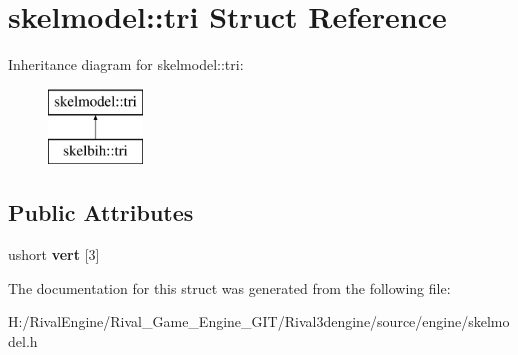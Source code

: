 \hypertarget{structskelmodel_1_1tri}{}\section{skelmodel\+:\+:tri Struct Reference}
\label{structskelmodel_1_1tri}
Inheritance diagram for skelmodel\+:\+:tri\+:\begin{figure}[H]
\begin{center}
\leavevmode
\includegraphics[height=2.000000cm]{structskelmodel_1_1tri}
\end{center}
\end{figure}
\subsection*{Public Attributes}
\begin{DoxyCompactItemize}
\item 
\mbox{\label{structskelmodel_1_1tri_a99b664da22e8a1d6eaefae6941d7a533}} 
ushort {\bfseries vert} \mbox{[}3\mbox{]}
\end{DoxyCompactItemize}


The documentation for this struct was generated from the following file\+:\begin{DoxyCompactItemize}
\item 
H\+:/\+Rival\+Engine/\+Rival\+\_\+\+Game\+\_\+\+Engine\+\_\+\+G\+I\+T/\+Rival3dengine/source/engine/skelmodel.\+h\end{DoxyCompactItemize}
